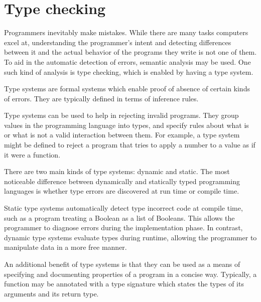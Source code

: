 \section{Type checking}

Programmers inevitably make mistakes. While there are many tasks computers excel at, understanding the programmer's intent and detecting differences between it and the actual behavior of the programs they write is not one of them. To aid in the automatic detection of errors, semantic analysis may be used. One such kind of analysis is type checking, which is enabled by having a type system.

Type systems are formal systems which enable proof of absence of certain kinds of errors. They are typically defined in terms of inference rules.

Type systems can be used to help in rejecting invalid programs. They group values in the programming language into types, and specify rules about what is or what is not a valid interaction between them. For example, a type system might be defined to reject a program that tries to apply a number to a value as if it were a function.

There are two main kinds of type systems: dynamic and static. The most noticeable difference between dynamically and statically typed programming languages is whether type errors are discovered at run time or compile time.

Static type systems automatically detect type incorrect code at compile time, such as a program treating a Boolean as a list of Booleans. This allows the programmer to diagnose errors during the implementation phase. In contrast, dynamic type systems evaluate types during runtime, allowing the programmer to manipulate data in a more free manner.

An additional benefit of type systems is that they can be used as a means of specifying and documenting properties of a program in a concise way. Typically, a function may be annotated with a type signature which states the types of its arguments and its return type. 



